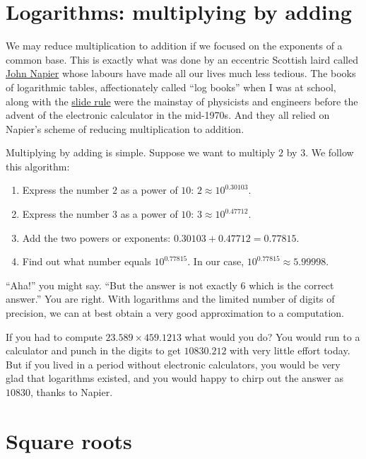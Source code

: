\documentclass[
  a4paper,
]{article}
\begin{document}
\hypertarget{logarithms-multiplying-by-adding}{%
\section{Logarithms: multiplying by
adding}\label{logarithms-multiplying-by-adding}}

We may reduce multiplication to addition if we focused on the exponents
of a common base. This is exactly what was done by an eccentric Scottish
laird called
\href{http://www-history.mcs.st-andrews.ac.uk/Biographies/Napier.html}{John
Napier} whose labours have made all our lives much less tedious. The
books of logarithmic tables, affectionately called ``log books'' when I
was at school, along with the \href{http://sliderulemuseum.com/}{slide
rule} were the mainstay of physicists and engineers before the advent of
the electronic calculator in the mid-1970s. And they all relied on
Napier's scheme of reducing multiplication to addition.

Multiplying by adding is simple. Suppose we want to multiply \(2\) by
\(3\). We follow this algorithm:

\begin{enumerate}
\item
  Express the number \(2\) as a power of \(10\):
  \(2 \approx 10^{0.30103}\).
\item
  Express the number \(3\) as a power of \(10\):
  \(3 \approx 10^{0.47712}\).
\item
  Add the two powers or exponents: \(0.30103 + 0.47712 = 0.77815\).
\item
  Find out what number equals \(10^{0.77815}\). In our case,
  \(10^{0.77815} \approx 5.99998\).
\end{enumerate}

``Aha!'' you might say. ``But the answer is not exactly \(6\) which is
the correct answer.'' You are right. With logarithms and the limited
number of digits of precision, we can at best obtain a very good
approximation to a computation.

If you had to compute \(23.589 \times 459.1213\) what would you do? You
would run to a calculator and punch in the digits to get \(10830.212\)
with very little effort today. But if you lived in a period without
electronic calculators, you would be very glad that logarithms existed,
and you would happy to chirp out the answer as \(10830\), thanks to
Napier.

\hypertarget{square-roots}{%
\section{Square roots}\label{square-roots}}
\end{document}
